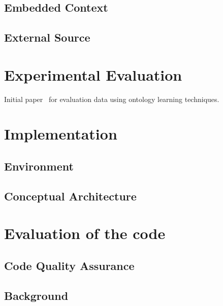 \documentclass[draft,final]{vutinfth} %
\begin{document}
\section{Embedded Context}\label{sec:embedded_context}

\section{External Source}\label{sec:external_source}



\chapter{Experimental Evaluation}
Initial paper~\cite{liu2005semi} for evaluation data using ontology learning techniques.


\chapter{Implementation}\label{chap:implementation}
\section{Environment}
\section{Conceptual Architecture}




\chapter{Evaluation of the code}
\section{Code Quality Assurance}
\section{Background}
\end{document}

